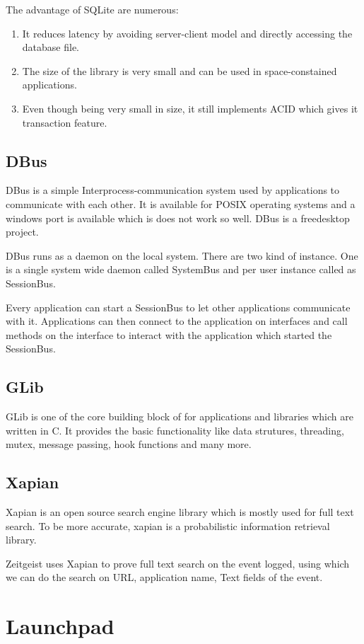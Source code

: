 The advantage of SQLite are numerous:
\begin{enumerate}
\item It reduces latency by avoiding server-client model and directly accessing 
the database file.
\item The size of the library is very small and can be used in space-constained 
applications. 
\item Even though being very small in size, it still implements ACID which 
gives it transaction feature.
\end{enumerate}

\subsection{DBus}
DBus is a simple Interprocess-communication system used by applications to communicate 
with each other. It is available for POSIX operating systems and a windows port is 
available which is does not work so well. DBus is a freedesktop project.

DBus runs as a daemon on the local system. There are two kind of instance. One is a 
single system wide daemon called SystemBus and per user instance called as SessionBus. 

Every application can start a SessionBus to let other applications communicate with it. 
Applications can then connect to the application on interfaces and call methods on the 
interface to interact with the application which started the SessionBus.
\subsection{GLib}
GLib is one of the core building block of for applications and libraries which are 
written in C. It provides the basic functionality like data strutures, threading, mutex, 
message passing, hook functions and many more.

\subsection{Xapian}
Xapian is an open source search engine library which is mostly used for full text 
search. To be more accurate, xapian is a probabilistic information retrieval library.

Zeitgeist uses Xapian to prove full text search on the event logged, using which 
we can do the search on URL, application name, Text fields of the event.

\section{Launchpad}

